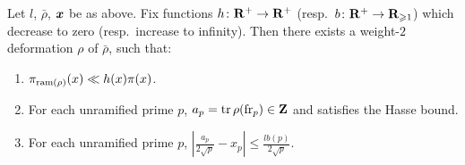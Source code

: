\begin{theorem}\label{thm:master-Galois}
Let $l$, $\bar\rho$, ${\boldsymbol x}$ be as above. Fix functions 
$h\colon \mathbf{R}^+\to \mathbf{R}^+$ (resp.~$b\colon \mathbf{R}^+ \to \mathbf{R}_{\geqslant 1}$) which 
decrease to zero (resp.~increase to infinity). Then there exists a weight-$2$ 
deformation $\rho$ of $\bar\rho$, such that: 
\begin{enumerate}
\item
$\pi_{\mathrm{ram}(\rho)}(x) \ll h(x) \pi(x)$. 

\item
For each unramified prime $p$, $a_p=\operatorname{tr}\rho(\mathrm{fr}_p)\in \mathbf{Z}$ and satisfies the 
Hasse bound. 

\item
For each unramified prime $p$, 
$\left| \frac{a_p}{2\sqrt p} - x_p\right| \leqslant \frac{l b(p)}{2\sqrt p}$. 
\end{enumerate}
\end{theorem}
